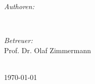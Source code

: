 \begin{titlepage}
\begin{minipage}{0.45\textwidth}
\begin{flushleft} \large
\emph{Authoren:}\\
\@author
\end{flushleft}
\end{minipage}
~
\begin{minipage}{0.45\textwidth}
\begin{flushright} \large
\emph{Betreuer:} \\
Prof. Dr. Olaf Zimmermann \\[1.2em] %
\end{flushright}
\end{minipage}\\[1cm]


{\large \today}\\[2cm] %

\vfill %

\end{titlepage}